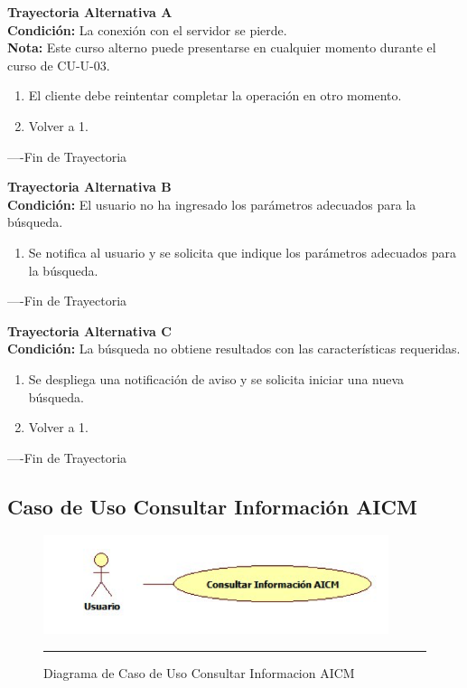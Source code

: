 \begin{flushleft}
	\hypertarget{TrayectoriaA_CU-U-03}{}
	\textbf{Trayectoria Alternativa A}\\
	\textbf{Condición:} La conexión con el servidor se pierde. \\
	\textbf{Nota: } Este curso alterno puede presentarse en cualquier momento durante el curso de CU-U-03. \\	
	\begin{enumerate}
		\item El cliente debe reintentar completar la operación en otro momento. 
		\item Volver a 1. 
	\end{enumerate}
\end{flushleft}
----Fin de Trayectoria

\begin{flushleft}
	\hypertarget{TrayectoriaB_CU-U-03}{}
	\textbf{Trayectoria Alternativa B}\\
	\textbf{Condición:} El usuario no ha ingresado los parámetros adecuados para la búsqueda. \\
	\begin{enumerate}
		\item  Se notifica al usuario y se solicita que indique los parámetros adecuados para la búsqueda.
	\end{enumerate}
\end{flushleft}
----Fin de Trayectoria

\begin{flushleft}
	\hypertarget{TrayectoriaC_CU-U-03}{}
	\textbf{Trayectoria Alternativa C}\\
	\textbf{Condición:} La búsqueda no obtiene resultados con las características requeridas. \\
	\begin{enumerate}
		\item Se despliega una notificación de aviso y se solicita iniciar una nueva búsqueda. 
		\item Volver a 1.
	\end{enumerate}
\end{flushleft}
----Fin de Trayectoria
\clearpage
\subsection{Caso de Uso Consultar Información AICM}

\begin{figure}[htbp]
	\centering
		\includegraphics[width=0.9\textwidth]{Figuras/cuConsultarInformacionAICM.png}
		\rule{30em}{0.5pt}
	\caption[Diagrama de Caso de Uso Consultar Informacion AICM]{Diagrama de Caso de Uso Consultar Informacion AICM}
	\label{fig:cuConsultarInformacionAICM}
\end{figure}

